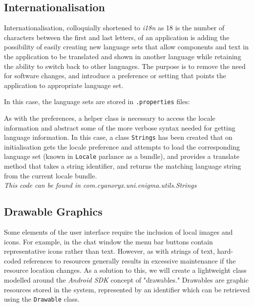   \subsection{Internationalisation}
  
  Internationalisation, colloquially shortened to \emph{i18n} as 18 is the number of characters between the first and last letters, of an application is adding the possibility of easily creating new language sets that allow components and text in the application to be translated and shown in another language while retaining the ability to switch back to other languages. The purpose is to remove the need for software changes, and introduce a preference or setting that points the application to appropriate language set.
  
  In this case, the language sets are stored in \verb!.properties! files:
  
  
  
  As with the preferences, a helper class is necessary to access the locale information and abstract some of the more verbose syntax needed for getting language information. In this case, a class \verb!Strings! has been created that on initialisation gets the locale preference and attempts to load the corresponding language set (known in \verb!Locale! parlance as a bundle), and provides a translate method that takes a string identifier, and returns the matching language string from the current locale bundle. \\
  
  
  
  \emph{This code can be found in com.cyanoryx.uni.enigma.utils.Strings}
  
  \subsection{Drawable Graphics}
  
  Some elements of the user interface require the inclusion of local images and icons. For example, in the chat window the menu bar buttons contain representative icons rather than text. However, as with strings of text, hard-coded references to resources generally results in excessive maintenance if the resource location changes. As a solution to this, we will create a lightweight class modelled around the \emph{Android SDK} concept of "drawables." Drawables are graphic resources stored in the system, represented by an identifier which can be retrieved using the \verb!Drawable! class.\\
  
